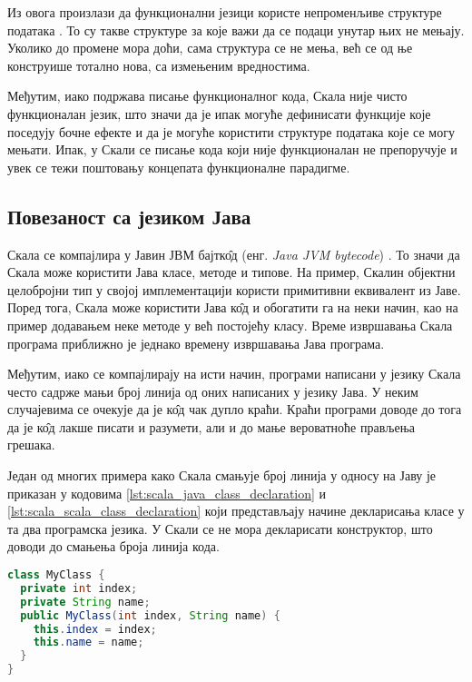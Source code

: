\documentclass[12pt,oneside]{memoir}
\begin{document}
Из овога произлази да функционални језици користе непроменљиве структуре података \cite{scala_prog}. То су такве структуре за које важи да се подаци унутар њих не мењају. Уколико до промене мора доћи, сама структура се не мења, већ се од ње конструише тотално нова, са измењеним вредностима.

Међутим, иако подржава писање функционалног кода, Скала није чисто функционалан језик, што значи да је ипак могуће дефинисати функције које поседују бочне ефекте и да је могуће користити структуре података које се могу мењати. Ипак, у Скали се писање кода који није функционалан не препоручује и увек се тежи поштовању концепата функционалне парадигме.

\subsection{Повезаност са језиком Јава}
\label{subsec:scala_komp}

Скала се компајлира у Јавин ЈВМ бајтк\^{о}д (енг. \textit{Java JVM bytecode}) \cite{scala_prog}. То значи да Скала може користити Јава класе, методе и типове. На пример, Скалин објектни целобројни тип у својој имплементацији користи примитивни еквивалент из Јаве. Поред тога, Скала може користити Јава к\^{о}д и обогатити га на неки начин, као на пример додавањем неке методе у већ постојећу класу. Време извршавања Скала програма приближно је једнако времену извршавања Јава програма.

Међутим, иако се компајлирају на исти начин, програми написани у језику Скала често садрже мањи број линија од оних написаних у језику Јава. У неким случајевима се очекује да је к\^{о}д чак дупло краћи. Краћи програми доводе до тога да је к\^{о}д лакше писати и разумети, али и до мање вероватноће прављења грешака.

Један од многих примера како Скала смањује број линија у односу на Јаву је приказан у кодовима \ref{lst:scala_java_class_declaration} и \ref{lst:scala_scala_class_declaration} који представљају начине декларисања класе у та два програмска језика. У Скали се не мора декларисати конструктор, што доводи до смањења броја линија кода.

\begin{lstlisting}[caption={Декларација класе у језику Јава}, language=Java, label={lst:scala_java_class_declaration}]
class MyClass {  
  private int index;
  private String name;
  public MyClass(int index, String name) {
    this.index = index;
    this.name = name;
  }
}
\end{lstlisting}
\end{document}
